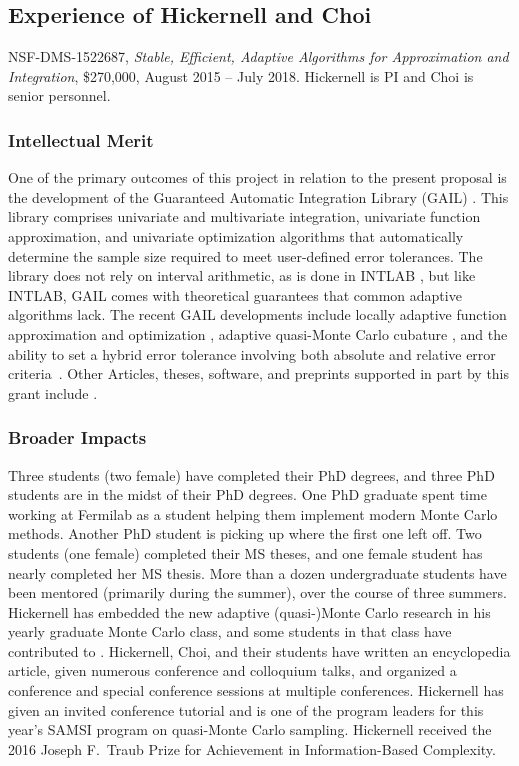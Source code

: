 \documentclass[11pt]{NSFamsart}
\begin{document}
\subsection{Experience of Hickernell and Choi}
NSF-DMS-1522687, \emph{Stable, Efficient, Adaptive Algorithms for Approximation and 
Integration}, \$270,000, August 2015 -- July 2018. \label{SectHickernellPrevious}  Hickernell is PI and Choi is senior personnel.  

\subsubsection{Intellectual Merit}
One of the primary outcomes of this project in relation to the present proposal is the development of the \hypertarget{GAILlink}{Guaranteed Automatic Integration Library (GAIL)} \cite{ChoEtal17b}.  This library comprises univariate and multivariate integration, univariate function approximation, and univariate optimization algorithms that automatically determine the sample size required to meet user-defined error tolerances.  The library does not rely on interval arithmetic, as is done in INTLAB \cite{MoKeCl09, Rum99a, Rum10a}, but like INTLAB, GAIL comes with theoretical guarantees that common adaptive algorithms lack. The recent GAIL developments include locally adaptive function approximation and optimization \cite{ChoEtal17a, Din15a}, adaptive quasi-Monte Carlo cubature \cite{HicJim16a, JimHic16a}, and the ability to set a hybrid error tolerance involving both absolute and relative error criteria~\cite{HicEtal17a}.  Other Articles, theses,  software, and preprints supported in part by this grant include 
\cite{ala_augmented_2017, 
	GilEtal16a,
	GilJim16b,
	HicEtal18a,	
	Hic17a,
	JohFasHic18a,
	Li16a,
	Liu17a,
	mccourt_stable_2017,
	mishra_hybrid_nodate,
	mishra_stable_nodate, 
	rashidinia_stable_nodate,
	vu_rbf-fd_nodate,
	Zha17a,
	Zho15a,
	ZhoHic15a}.
    
\subsubsection{Broader Impacts}  Three students (two female) have completed their PhD degrees, and three PhD students are in the midst of their PhD degrees.  One PhD graduate spent time working at Fermilab as a student helping them implement modern Monte Carlo methods.  Another PhD student is picking up where the first one left off.  Two students (one female) completed their MS theses, and one female student has nearly completed her MS thesis. More than a dozen undergraduate students have been mentored (primarily during the summer),  over the course of three summers.  Hickernell has embedded the new adaptive (quasi-)Monte Carlo research in his yearly graduate Monte Carlo class, and some students in that class have contributed to \GAIL.  Hickernell, Choi, and their students have written an encyclopedia article, given numerous conference and colloquium talks, and organized a conference and special conference sessions at multiple conferences.  Hickernell has given an invited conference tutorial and is one of the program leaders for this year's SAMSI program on quasi-Monte Carlo sampling. Hickernell received the 2016 Joseph F.\ Traub Prize for Achievement in Information-Based Complexity.
\end{document}
